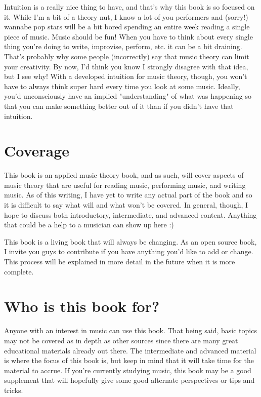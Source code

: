 \documentclass[../OpenAppliedMusicTheory.tex]{subfiles}
\begin{document}
    Intuition is a really nice thing to have, and that's why this book is so focused on it. While I'm a bit of a theory nut, I know a lot of you performers and (sorry!) wannabe pop stars will be a bit bored spending an entire week reading a single piece of music. Music should be fun! When you have to think about every single thing you're doing to write, improvise, perform, etc. it can be a bit draining. That's probably why some people (incorrectly) say that music theory can limit your creativity. By now, I'd think you know I strongly disagree with that idea, but I see why! With a developed intuition for music theory, though, you won't have to always think super hard every time you look at some music. Ideally, you'd unconsciously have an implied "understanding" of what was happening so that you can make something better out of it than if you didn't have that intuition.

    \section*{Coverage}\label{about:coverage}
    This book is an applied music theory book, and as such, will cover aspects of music theory that are useful for reading music, performing music, and writing music. As of this writing, I have yet to write any actual part of the book and so it is difficult to say what will and what won't be covered. In general, though, I hope to discuss both introductory, intermediate, and advanced content. Anything that could be a help to a musician can show up here :)

    This book is a living book that will always be changing. As an open source book, I invite you guys to contribute if you have anything you'd like to add or change. This process will be explained in more detail in the future when it is more complete.  

    \section*{Who is this book for?}\label{about:audience}
    Anyone with an interest in music can use this book. That being said, basic topics may not be covered as in depth as other sources since there are many great educational materials already out there. The intermediate and advanced material is where the focus of this book is, but keep in mind that it will take time for the material to accrue. If you're currently studying music, this book may be a good supplement that will hopefully give some good alternate perspectives or tips and tricks.
\end{document}
